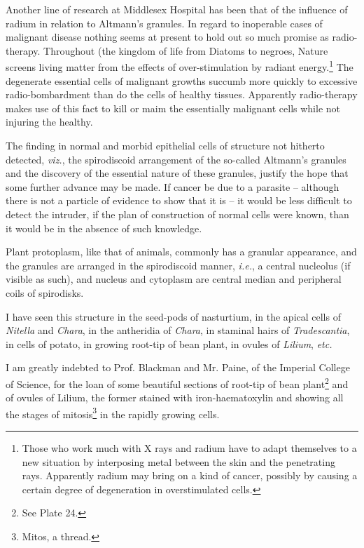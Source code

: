 \documentclass[a4paper, 12pt, oneside]{article}
\begin{document}
Another line of research at Middlesex Hospital has been that of the influence of radium in relation to Altmann's granules. In regard to inoperable cases of malignant disease nothing seems at present to hold out so much promise as radio-therapy. Throughout (the kingdom of life from Diatoms to negroes, Nature screens living matter from the effects of over-stimulation by radiant energy.\footnote{Those who work much with X rays and radium have to adapt themselves to a new situation by interposing metal between the skin and the penetrating rays. Apparently radium may bring on a kind of cancer, possibly by causing a certain degree of degeneration in overstimulated cells.} The degenerate essential cells of malignant growths succumb more quickly to excessive radio-bombardment than do the cells of healthy tissues. Apparently radio-therapy makes use of this fact to kill or maim the essentially malignant cells while not injuring the healthy.

The finding in normal and morbid epithelial cells of structure not hitherto detected, \emph{viz.}, the spirodiscoid arrangement of the so-called Altmann's granules and the discovery of the essential nature of these granules, justify the hope that some further advance may be made. If cancer be due to a parasite -- although there is not a particle of evidence to show that it is -- it would be less difficult to detect the intruder, if the plan of construction of normal cells were known, than it would be in the absence of such knowledge.

Plant protoplasm, like that of animals, commonly has a granular appearance, and the granules are arranged in the spirodiscoid manner, \emph{i.e.}, a central nucleolus (if visible as such), and nucleus and cytoplasm are central median and peripheral coils of spirodisks.

I have seen this structure in the seed-pods of nasturtium, in the apical cells of \emph{Nitella} and \emph{Chara}, in the antheridia of \emph{Chara}, in staminal hairs of \emph{Tradescantia}, in cells of potato, in growing root-tip of bean plant, in ovules of \emph{Lilium}, \emph{etc.}

I am greatly indebted to Prof. Blackman and Mr. Paine, of the Imperial College of Science, for the loan of some beautiful sections of root-tip of bean plant\footnote{See Plate 24.} and of ovules of Lilium, the former stained with iron-haematoxylin and showing all the stages of mitosis\footnote{Mitos, a thread.} in the rapidly growing cells.
\end{document}
